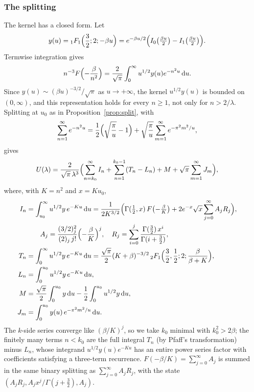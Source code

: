 \documentclass[11pt,reqno]{amsart}
\theoremstyle{definition}
\theoremstyle{remark}
\newcommand{\dd}{\,\mathrm{d}}
\begin{document}
\subsubsection{The splitting}
The kernel has a closed form. Let
\[
  y(u) = {}_1F_1\Bigl(\frac32; 2; -\beta u\Bigr) = e^{-\beta u/2}\Bigl(I_0\bigl(\tfrac{\beta u}{2}\bigr) - I_1\bigl(\tfrac{\beta u}2\bigr)\Bigr).
\]
Termwise integration gives
\[
  n^{-3}F\Bigl(-\frac\beta{n^2}\Bigr) = \frac{2}{\sqrt\pi}\int_0^\infty u^{1/2}y(u)e^{-n^2u}\dd u.
\]
Since
$y(u) \sim (\beta u)^{-3/2}/\sqrt\pi$ as $u \to +\infty$, the kernel $u^{1/2}y(u)$ is bounded on $(0,\infty)$, and this
representation holds for every $n \ge 1$, not only for $n > 2/\lambda$. Splitting at $u_0$ as in
Proposition~\ref{prop:split}, with
\[
  \sum_{n=1}^{\infty}e^{-n^2u} = \frac12\Bigl(\sqrt{\frac\pi u} - 1\Bigr) + \sqrt{\frac\pi u}\sum_{m=1}^{\infty}e^{-\pi^2m^2/u},
\]
gives
\[
  U(\lambda) = \frac{2}{\sqrt\pi\,\lambda^3}\Bigl(\sum_{n=k_0}^{\infty}I_n + \sum_{n=1}^{k_0-1}(T_n - L_n) + M + \sqrt\pi\sum_{m=1}^{\infty}J_m\Bigr),
\]
where, with $K = n^2$ and $x = Ku_0$,
\begin{align*}
  I_n &= \int_{u_0}^\infty u^{1/2}y\,e^{-Ku}\dd u
       = \frac{1}{2K^{3/2}}\Bigl(\Gamma(\tfrac12, x)\,F\bigl(-\tfrac\beta K\bigr)
         + 2e^{-x}\sqrt x\sum_{j=0}^{\infty}A_jR_j\Bigr), \\
  &\qquad A_j = \frac{(3/2)_j^2}{(2)_j\,j!}\Bigl(-\frac\beta K\Bigr)^j, \quad R_j = \sum_{i=0}^{j}\frac{\Gamma(\frac32)\,x^i}{\Gamma(i+\frac32)}, \\
  T_n &= \int_0^\infty u^{1/2}y\,e^{-Ku}\dd u = \frac{\sqrt\pi}{2}(K+\beta)^{-3/2}\,{}_2F_1\Bigl(\frac32,\frac12;2;\frac{\beta}{\beta+K}\Bigr), \\
  L_n &= \int_0^{u_0}u^{1/2}y\,e^{-Ku}\dd u, \\
  M &= \frac{\sqrt\pi}2\int_0^{u_0}y\dd u - \frac12\int_0^{u_0}u^{1/2}y\dd u, \\
  J_m &= \int_0^{u_0}y(u)\,e^{-\pi^2m^2/u}\dd u .
\end{align*}
The $k$-side series converge like $(\beta/K)^j$, so we take $k_0$ minimal with $k_0^2 > 2\beta$; the finitely many terms
$n < k_0$ are the full integral $T_n$ (by Pfaff's transformation) minus $L_n$, whose integrand $u^{1/2}y(u)e^{-Ku}$ has an
entire power series factor with coefficients satisfying a three-term recurrence. $F(-\beta/K) = \sum_{j=0}^{\infty}A_j$ is summed in the
same binary splitting as $\sum_{j=0}^{\infty}A_jR_j$, with the state $(A_jR_j, A_jx^j/\Gamma(j+\frac32), A_j)$.
\end{document}
